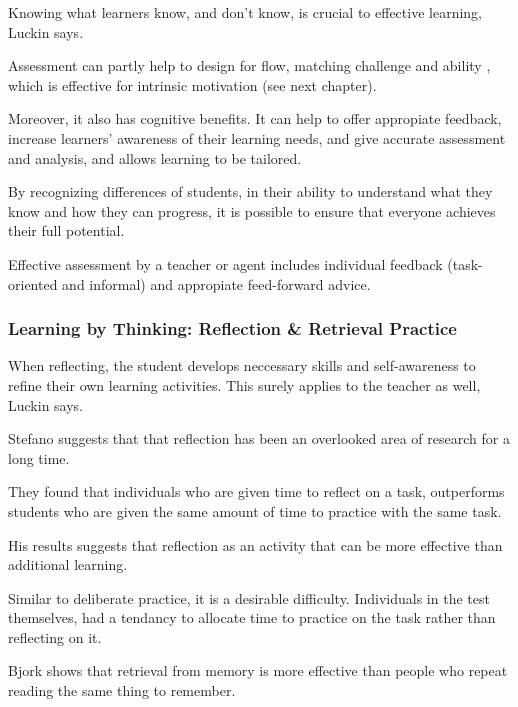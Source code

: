   Knowing what learners know, and don't know, is crucial to effective learning, Luckin \cite{luckin} says.

  Assessment can partly help to design for flow, matching challenge and ability \cite{bruhlmann}, which is effective for intrinsic motivation (see next chapter).

  Moreover, it also has cognitive benefits. It can help to offer appropiate feedback, increase learners' awareness of their learning needs, and give accurate assessment and analysis, and allows learning to be tailored.

  By recognizing differences of students, in their ability to understand what they know and how they can progress, it is possible to ensure that everyone achieves their full potential.

  Effective assessment by a teacher or agent includes individual feedback (task-oriented and informal) and appropiate feed-forward advice.

  \subsubsection{Learning by Thinking: Reflection \& Retrieval Practice}

  When reflecting, the student develops neccessary skills and self-awareness to refine their own learning activities. This surely applies to the teacher as well, Luckin says. \cite{luckin}

  Stefano \cite{stefano} suggests that that reflection has been an overlooked area of research for a long time.

  They found that individuals who are given time to reflect on a task, outperforms students who are given the same amount of time to practice with the same task.

  His results suggests that reflection as an activity that can be more effective than additional learning.

  Similar to deliberate practice, it is a desirable difficulty. Individuals in the test themselves, had a tendancy to allocate time to practice on the task rather than reflecting on it.


  Bjork \cite{bjork} shows that retrieval from memory is more effective than people who repeat reading the same thing to remember.

